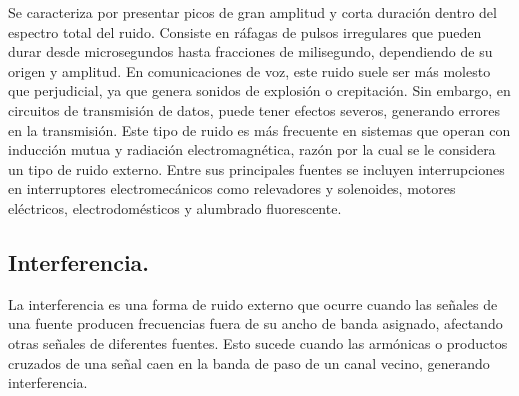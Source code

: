 \begin{justify}
    Se caracteriza por presentar picos de gran amplitud y corta duración dentro del espectro total del ruido. Consiste en ráfagas de pulsos irregulares
    que pueden durar desde microsegundos hasta fracciones de milisegundo, dependiendo de su origen y amplitud. En comunicaciones de voz, este ruido suele ser más
    molesto que perjudicial, ya que genera sonidos de explosión o crepitación. Sin embargo, en circuitos de transmisión de datos, puede tener efectos severos,
    generando errores en la transmisión​. Este tipo de ruido es más frecuente en sistemas que operan con inducción mutua y radiación electromagnética,
    razón por la cual se le considera un tipo de ruido externo. Entre sus principales fuentes se incluyen interrupciones en interruptores electromecánicos
    como relevadores y solenoides, motores eléctricos, electrodomésticos y alumbrado fluorescente.
\end{justify}

\subsection*{\fontsize{12}{18}\selectfont Interferencia.}

\begin{justify}
    La interferencia es una forma de ruido externo que ocurre cuando las señales de una fuente producen frecuencias fuera de su ancho de banda asignado,
    afectando otras señales de diferentes fuentes. Esto sucede cuando las armónicas o productos cruzados de una señal caen en la banda de paso de un canal vecino,
    generando interferencia.
\end{justify}